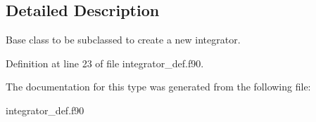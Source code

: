 \subsection{Detailed Description}
Base class to be subclassed to create a new integrator. 

Definition at line 23 of file integrator\+\_\+def.\+f90.



The documentation for this type was generated from the following file\+:\begin{DoxyCompactItemize}
\item 
integrator\+\_\+def.\+f90\end{DoxyCompactItemize}
